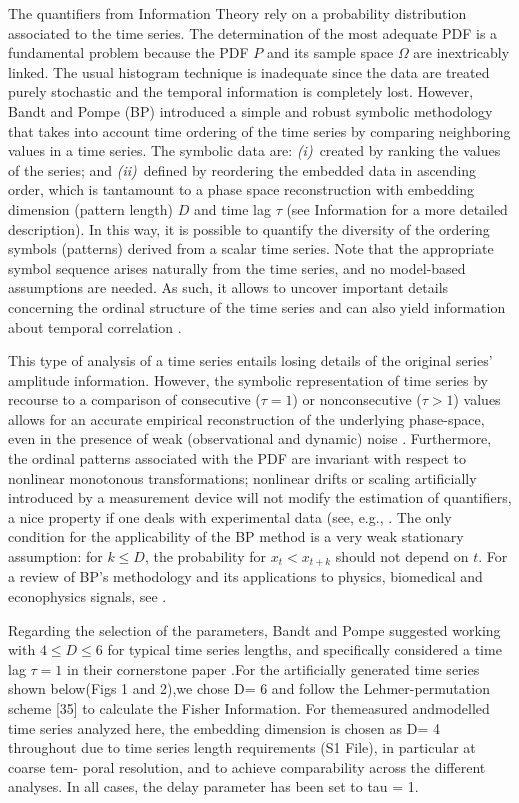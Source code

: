 The quantifiers from Information Theory rely on a probability distribution associated to the time series. 
The determination of the most adequate PDF is a fundamental problem because the PDF $P$ and its sample space 
$\Omega$ are inextricably linked. The usual histogram technique is inadequate since the data are treated purely stochastic and the temporal information is completely lost. 
However, Bandt and Pompe (BP)\cite{Bandt2002} introduced a simple and robust symbolic methodology that takes into account time ordering of the time series by comparing neighboring values in a time series.
The symbolic data are:
{\it (i)\/}~created by ranking the values of the series; and
{\it (ii)\/}~defined by reordering the embedded data in ascending order, which is tantamount to a phase space 
reconstruction with embedding dimension (pattern length) $D$ and time lag $\tau$ (see Information for a more detailed description). 
In this way, it is possible to quantify the diversity of the ordering symbols (patterns) derived from a scalar 
time series.
Note that the appropriate symbol sequence arises naturally from the time series, and no model-based assumptions 
are needed.
As such, it allows to uncover important details concerning the ordinal structure of the time series
\cite{Rosso2007} and can also yield information about temporal correlation \cite{Rosso2009}.

This type of analysis of a time series entails losing details of the original series' amplitude information. However, the symbolic representation of time series by recourse to a comparison of consecutive ($\tau = 1$) or nonconsecutive ($\tau > 1$) values allows for an accurate empirical reconstruction of the underlying phase-space, even in the presence of weak (observational and dynamic) noise \cite{Bandt2002}. Furthermore, the ordinal patterns associated with the PDF are invariant with respect to nonlinear monotonous transformations; nonlinear drifts or scaling artificially introduced by a measurement device will not modify the estimation of quantifiers, a nice property if one deals with experimental data (see, e.g., \cite{Saco2010}. 
The only condition for the applicability of the BP method is a very weak stationary assumption: for 
$k \leq D$, the probability for $x_t < x_{t+k}$ should not depend on $t$.
For a review of BP's methodology and its applications to physics, biomedical and econophysics signals, see \cite{Zanin2012}. 

Regarding the selection of the parameters, Bandt and Pompe suggested working with $4 \leq D \leq 6$ for typical time series lengths, and specifically considered a time lag $\tau = 1$ in their cornerstone paper \cite{Bandt2002}.For the artificially generated time series shown below(Figs 1 and 2),we chose D= 6 and follow the Lehmer-permutation scheme [35] to calculate the Fisher Information. For themeasured andmodelled time series analyzed here, the embedding dimension is chosen as D= 4 throughout due to time series length requirements (S1 File), in particular at coarse tem- poral resolution, and to achieve comparability across the different analyses. In all cases, the delay parameter has been set to tau = 1.

